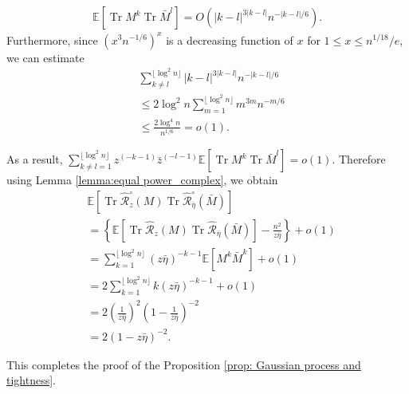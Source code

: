 \documentclass[12pt]{amsart}
\theoremstyle{plain}
\theoremstyle{definition}
\newcommand{\Tr}{\operatorname{Tr}}
\begin{document}
\begin{align*}
    \mathbb{E}[\Tr M^{k}\Tr \bar M^{l}]=O(|k-l|^{3|k-l|}n^{-|k-l|/6}).
\end{align*}
Furthermore, since $(x^3n^{-1/6})^{x}$ is a decreasing function of $x$ for $1\leq x \leq n^{1/18}/e$, we can estimate
\begin{align*}
    & \sum_{k\neq l}^{\lfloor \log^{2}n \rfloor}|k-l|^{3|k-l|}n^{-|k-l|/6}\\
    &\leq 2\log^{2}n\sum_{m=1}^{\lfloor \log^{2}n \rfloor}m^{3m}n^{-m/6}\\
    &\leq \frac{2\log^{4}n}{n^{1/6}}=o(1).
\end{align*}

As a result, $\sum_{k\neq l = 1}^{\lfloor \log^{2}n\rfloor}z^{(-k-1)}\bar{z}^{(-l-1)}\mathbb{E}[\Tr M^{k}\Tr\bar M^{l}]=o(1).$ Therefore using Lemma \ref{lemma:equal power_complex}, we obtain
\begin{align*}
    &\mathbb{E}[\Tr \hat{\mathcal{R}}_{z}^{\circ}(M)\Tr\hat{\mathcal{R}}_{\bar\eta}^{\circ}(\bar M)]\\
    &=\left\{\mathbb{E}[\Tr \hat{\mathcal{R}}_{z}(M)\Tr\hat{\mathcal{R}}_{\bar\eta}(\bar M)]-\frac{n^{2}}{z\bar \eta}\right\}+o(1)\\
    &=\sum_{k=1}^{\lfloor \log^{2}n \rfloor}(z\bar \eta)^{-k-1}\mathbb{E}[M^{k}\bar M^{k}] + o(1)\\
    &=2\sum_{k=1}^{\lfloor \log^{2}n \rfloor}k(z\bar \eta)^{-k-1}+o(1)\\
    &=2\left(\frac{1}{z\bar \eta}\right)^{2}\left(1-\frac{1}{z\bar \eta}\right)^{-2}\\
    &=2\left(1-z\bar\eta\right)^{-2}.
\end{align*}

This completes the proof of the Proposition \ref{prop: Gaussian process and tightness}.






\appendix
\renewcommand\thesection{A}
\section{}\label{sec:appendix_section}
\renewcommand{\theappendixlemma}{\Alph{section}.\arabic{appendixlemma}}
\end{document}
